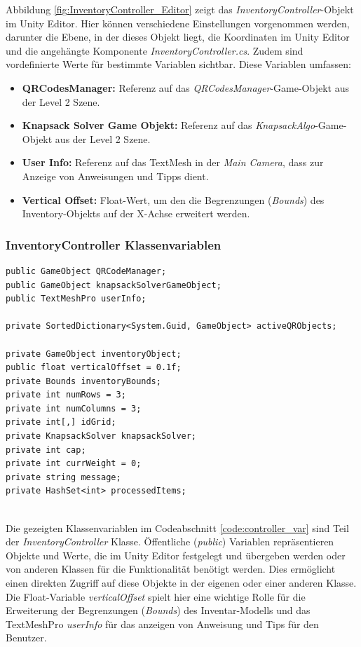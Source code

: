 Abbildung \ref{fig:InventoryController_Editor} zeigt das \textit{InventoryController}-Objekt im Unity Editor. Hier können
verschiedene Einstellungen vorgenommen werden, darunter die Ebene, in der dieses Objekt liegt, die Koordinaten im Unity
Editor und die angehängte Komponente \textit{InventoryController.cs}. Zudem sind vordefinierte Werte für bestimmte Variablen
sichtbar. Diese Variablen umfassen:

\begin{itemize}
    \item \textbf{QRCodesManager:} Referenz auf das \textit{QRCodesManager}-Game-Objekt aus der Level 2 Szene.
    \item \textbf{Knapsack Solver Game Objekt:} Referenz auf das \textit{KnapsackAlgo}-Game-Objekt aus der Level 2 Szene.
    \item \textbf{User Info:} Referenz auf das TextMesh in der \textit{Main Camera}, dass zur Anzeige von Anweisungen und
    Tipps dient.
    \item \textbf{Vertical Offset:} Float-Wert, um den die Begrenzungen (\textit{Bounds}) des Inventory-Objekts auf der
    X-Achse erweitert werden.
\end{itemize}

\subsubsection{InventoryController Klassenvariablen}
\begin{lstlisting}[style=csharp, caption={Klassenvariablen der InventoryController Klasse}, label=code:controller_var]
public GameObject QRCodeManager;
public GameObject knapsackSolverGameObject;
public TextMeshPro userInfo;

private SortedDictionary<System.Guid, GameObject> activeQRObjects;

private GameObject inventoryObject;
public float verticalOffset = 0.1f;
private Bounds inventoryBounds;
private int numRows = 3;
private int numColumns = 3;
private int[,] idGrid;
private KnapsackSolver knapsackSolver;
private int cap;
private int currWeight = 0;
private string message;
private HashSet<int> processedItems;
\end{lstlisting}\\
Die gezeigten Klassenvariablen im Codeabschnitt \ref{code:controller_var} sind Teil der \textit{InventoryController} Klasse.
Öffentliche (\textit{public}) Variablen repräsentieren Objekte und Werte, die im Unity Editor festgelegt und übergeben
werden oder von anderen Klassen für die Funktionalität benötigt werden. Dies ermöglicht einen direkten Zugriff auf diese
Objekte in der eigenen oder einer anderen Klasse. Die Float-Variable \textit{verticalOffset} spielt hier eine wichtige Rolle
für die Erweiterung der Begrenzungen (\textit{Bounds}) des Inventar-Modells und das TextMeshPro \textit{userInfo} für das
anzeigen von Anweisung und Tips für den Benutzer.

